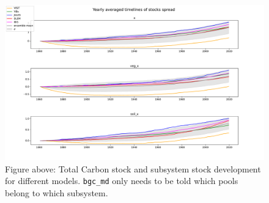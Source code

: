 \begin{figure}[t]
	\includegraphics[width=\columnwidth]{test_stock_mean.pdf}
  \caption{
  Figure above: Total Carbon stock and subsystem stock development for different models.
  \texttt{bgc\_md} only needs to be told which pools belong to which subsystem.
  }
\end{figure}  


